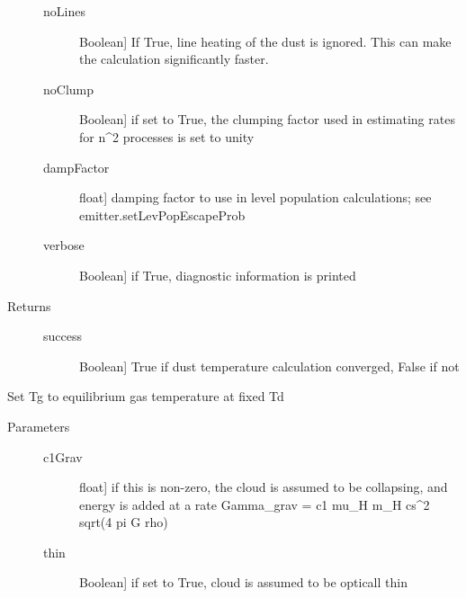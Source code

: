 \documentclass[letterpaper,10pt,english]{sphinxmanual}
\begin{document}
\begin{fulllineitems}
\begin{fulllineitems}
\begin{description}
\begin{description}
\item[{noLines}] \leavevmode{[}Boolean{]}
If True, line heating of the dust is ignored. This can
make the calculation significantly faster.

\item[{noClump}] \leavevmode{[}Boolean{]}
if set to True, the clumping factor used in estimating
rates for n\textasciicircum{}2 processes is set to unity

\item[{dampFactor}] \leavevmode{[}float{]}
damping factor to use in level population calculations;
see emitter.setLevPopEscapeProb

\item[{verbose}] \leavevmode{[}Boolean{]}
if True, diagnostic information is printed

\end{description}

\item[{Returns}] \leavevmode\begin{description}
\item[{success}] \leavevmode{[}Boolean{]}
True if dust temperature calculation converged, False if
not

\end{description}

\end{description}

\end{fulllineitems}


\begin{fulllineitems}
\label{fulldoc:despotic.cloud.setGasTempEq}
Set Tg to equilibrium gas temperature at fixed Td
\begin{description}
\item[{Parameters}] \leavevmode\begin{description}
\item[{c1Grav}] \leavevmode{[}float{]}
if this is non-zero, the cloud is assumed to be
collapsing, and energy is added at a rate
Gamma\_grav = c1 mu\_H m\_H cs\textasciicircum{}2 sqrt(4 pi G rho)

\item[{thin}] \leavevmode{[}Boolean{]}
if set to True, cloud is assumed to be opticall thin


\end{description}
\end{description}
\end{fulllineitems}
\end{fulllineitems}
\end{document}
